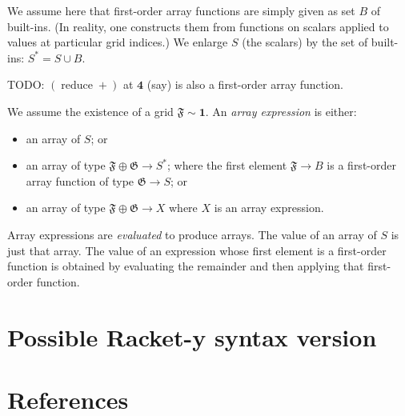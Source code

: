 \documentclass[11pt]{article}
\newcommand{\gr}[1]{\mathfrak{#1}}
\newcommand{\unit}{\mathbf{1}}
\DeclareMathOperator{\reduce}{reduce}
\begin{document}
We assume here that first-order array functions are simply given as set \(B\) of
built-ins.  (In reality, one constructs them from functions on scalars applied
to values at particular grid indices.) We enlarge \(S\) (the scalars) by the set
of built-ins: \(S^* = S\cup B\).

TODO: \((\reduce +)\) at \(\mathbf{4}\) (say) is also a first-order array function.  

We assume the existence of a grid \(\gr{F}\sim\unit\). An \emph{array expression} is
either:
\begin{itemize}
\item an array of \(S\); or
\item an array of type \(\gr{F}\oplus\gr{G}\to S^*\); where the first element
\(\gr{F}\to B\) is a first-order array function of type \(\gr{G}\to S\); or
\item an array of type \(\gr{F}\oplus\gr{G}\to X\) where \(X\) is an array expression.
\end{itemize}

Array expressions are \emph{evaluated} to produce arrays. The value of an array of
\(S\) is just that array. The value of an expression whose first element is a
first-order function is obtained by evaluating the remainder and then applying
that first-order function.

\section{Possible Racket-y syntax version}
\label{sec:orga1852e4}


\section{References}
\label{sec:orgbf56ab8}

\label{org334ac2d}


\label{orgefbceba}

\end{document}
